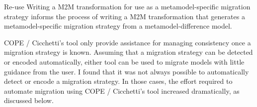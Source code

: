 \documentclass[a4paper]{article}
\begin{document}
Re-use
Writing a M2M transformation for use as a metamodel-specific migration strategy informs the process of writing a M2M transformation that generates a metamodel-specific migration strategy from a metamodel-difference model.



COPE / Cicchetti's tool only provide assistance for managing consistency once a migration strategy is known. Assuming that a migration strategy can be detected or encoded automatically, either tool can be used to migrate models with little guidance from the user. I found that it was not always possible to automatically detect or encode a migration strategy. In those cases, the effort required to automate migration using COPE / Cicchetti's tool increased dramatically, as discussed below.
\end{document}
